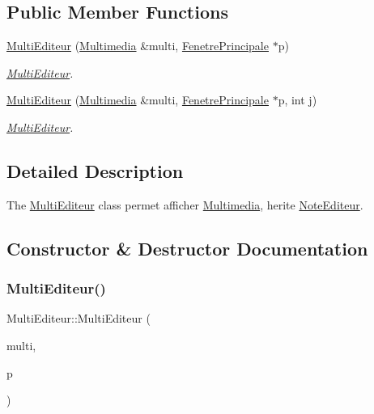 \subsection*{Public Member Functions}
\begin{DoxyCompactItemize}
\item 
\hyperlink{class_multi_editeur_a7a3f689abaf2b3c5783c529128f67ad8}{Multi\+Editeur} (\hyperlink{class_multimedia}{Multimedia} \&multi, \hyperlink{class_fenetre_principale}{Fenetre\+Principale} $\ast$p)
\begin{DoxyCompactList}\small\item\em \hyperlink{class_multi_editeur}{Multi\+Editeur}. \end{DoxyCompactList}\item 
\hyperlink{class_multi_editeur_abc1f09828dc220dcf4cb45be5d94099d}{Multi\+Editeur} (\hyperlink{class_multimedia}{Multimedia} \&multi, \hyperlink{class_fenetre_principale}{Fenetre\+Principale} $\ast$p, int j)
\begin{DoxyCompactList}\small\item\em \hyperlink{class_multi_editeur}{Multi\+Editeur}. \end{DoxyCompactList}\end{DoxyCompactItemize}


\subsection{Detailed Description}
The \hyperlink{class_multi_editeur}{Multi\+Editeur} class permet afficher \hyperlink{class_multimedia}{Multimedia}, herite \hyperlink{class_note_editeur}{Note\+Editeur}. 

\subsection{Constructor \& Destructor Documentation}
\mbox{\label{class_multi_editeur_a7a3f689abaf2b3c5783c529128f67ad8}} 
\subsubsection{\texorpdfstring{Multi\+Editeur()}{MultiEditeur()}\hspace{0.1cm}{\footnotesize\ttfamily [1/2]}}
{\footnotesize\ttfamily Multi\+Editeur\+::\+Multi\+Editeur (\begin{DoxyParamCaption}\item[{\hyperlink{class_multimedia}{Multimedia} \&}]{multi,  }\item[{\hyperlink{class_fenetre_principale}{Fenetre\+Principale} $\ast$}]{p }\end{DoxyParamCaption})}



